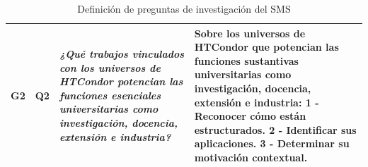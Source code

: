 \begin{table}[H]
\begin{tabular}{|p{0.7cm}|p{1.3cm}|p{5.5cm}|p{6cm}|}
		G2                                                                                                                                                                                                                                                                                                                                               & Q2                &
		\textit{¿Qué trabajos vinculados con los universos de HTCondor potencian las funciones esenciales universitarias como investigación, docencia, extensión e industria?}                                                                                                                                                                           &
		Sobre los universos de HTCondor que potencian las funciones sustantivas universitarias como investigación, docencia, extensión e industria: 1 - Reconocer cómo están estructurados. 2 - Identificar sus aplicaciones. 3 - Determinar su motivación contextual.                                                                                                                                                          \\ \hline
	\end{tabular}
	\caption{Definición de preguntas de investigación del SMS}
	\label{tab:preguntas}
\end{table}

